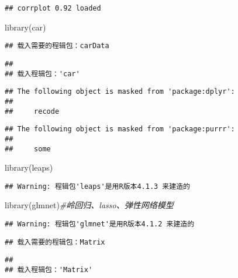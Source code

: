 \documentclass[]{ctexbook}
\newenvironment{Shaded}{\begin{snugshade}}{\end{snugshade}}
\newcommand{\CommentTok}[1]{\textcolor[rgb]{0.56,0.35,0.01}{\textit{#1}}}
\newcommand{\FunctionTok}[1]{\textcolor[rgb]{0.00,0.00,0.00}{#1}}
\newcommand{\NormalTok}[1]{#1}
\begin{document}
\begin{verbatim}
## corrplot 0.92 loaded
\end{verbatim}

\begin{Shaded}
\begin{Highlighting}[]
\FunctionTok{library}\NormalTok{(car)}
\end{Highlighting}
\end{Shaded}

\begin{verbatim}
## 载入需要的程辑包：carData
\end{verbatim}

\begin{verbatim}
## 
## 载入程辑包：'car'
\end{verbatim}

\begin{verbatim}
## The following object is masked from 'package:dplyr':
## 
##     recode
\end{verbatim}

\begin{verbatim}
## The following object is masked from 'package:purrr':
## 
##     some
\end{verbatim}

\begin{Shaded}
\begin{Highlighting}[]
\FunctionTok{library}\NormalTok{(leaps)}
\end{Highlighting}
\end{Shaded}

\begin{verbatim}
## Warning: 程辑包'leaps'是用R版本4.1.3 来建造的
\end{verbatim}

\begin{Shaded}
\begin{Highlighting}[]
\FunctionTok{library}\NormalTok{(glmnet)}\CommentTok{\#岭回归、lasso、弹性网络模型}
\end{Highlighting}
\end{Shaded}

\begin{verbatim}
## Warning: 程辑包'glmnet'是用R版本4.1.2 来建造的
\end{verbatim}

\begin{verbatim}
## 载入需要的程辑包：Matrix
\end{verbatim}

\begin{verbatim}
## 
## 载入程辑包：'Matrix'
\end{verbatim}
\end{document}
